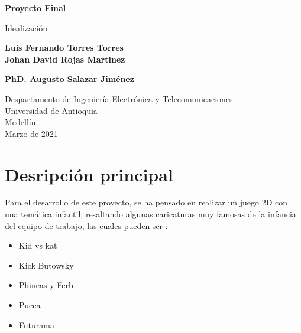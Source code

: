 \documentclass{article}
\begin{document}
\begin{titlepage}
    \begin{center}
        \vspace*{1cm}
            
        \Huge
        \textbf{Proyecto Final}
        
            
        \vspace{0.5cm}
        \LARGE
        Idealización 
            
        \vspace{1.5cm}
            
        \textbf{Luis Fernando Torres Torres\\Johan David Rojas Martinez}
        
        \vspace{4cm}
            
        \textbf{PhD. Augusto Salazar Jiménez}
            
        \vfill
            
        \vspace{0.8cm}
            
        \Large
        Despartamento de Ingeniería Electrónica y Telecomunicaciones\\
        Universidad de Antioquia\\
        Medellín\\
        Marzo de 2021
            
    \end{center}
\end{titlepage}

\tableofcontents%
\newpage

\section{Desripción principal}\label{Descripcion}
Para el desarrollo de este proyecto, se ha pensado en realizar un juego 2D con una temática infantil, resaltando algunas caricaturas muy famosas de la infancia del equipo de trabajo, las cuales pueden ser :

\begin{itemize}
\item Kid vs kat
\item Kick Butowsky
\item Phineas y Ferb 
\item Pucca 
\item Futurama
\end{itemize}
\end{document}
